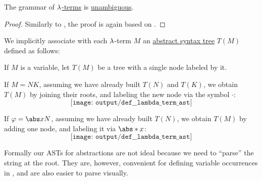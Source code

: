 \begin{proposition}\label{thm:lambda_terms_are_unambiguous}
  The grammar of \hyperref[def:lambda_term]{\( \mathrm{\lambda} \)-terms} is \hyperref[def:grammar_ambiguity]{unambiguous}.
\end{proposition}
\begin{proof}
  Similarly to , the proof is again based on .
\end{proof}

\begin{definition}\label{def:lambda_term_ast}
  We implicitly associate with each \( \mathrm{\lambda} \)-term \( M \) an \hyperref[rem:abstract_syntax_tree]{abstract syntax tree} \( T(M) \) defined as follows:
  \begin{thmenum}
     If \( M \) is a variable, let \( T(M) \) be a tree with a single node labeled by it.

     If \( M = NK \), assuming we have already built \( T(N) \) and \( T(K) \), we obtain \( T(M) \) by joining their roots, and labeling the new node via the symbol \( \cdot \):
    \begin{equation*}
      \texttt{[image: output/def\_\_lambda\_term\_ast]}
    \end{equation*}

     If \( \varphi = \abs x N \), assuming we have already built \( T(N) \), we obtain \( T(M) \) by adding one node, and labeling it via \( \abs* x \):
    \begin{equation*}
      \texttt{[image: output/def\_\_lambda\_term\_ast]}
    \end{equation*}
  \end{thmenum}
\end{definition}
\begin{comments}
  \item Formally our ASTs for abstractions are not ideal because we need to \enquote{parse} the string at the root. They are, however, convenient for defining variable occurrences in , and are also easier to parse visually.
\end{comments}

